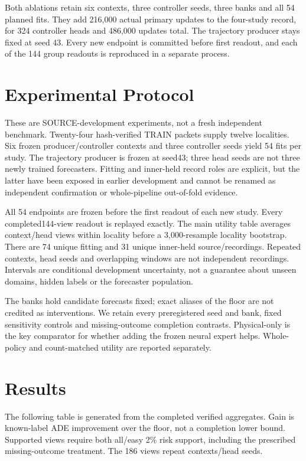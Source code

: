 \documentclass[10pt,twocolumn,letterpaper]{article}
\begin{document}
Both ablations retain six contexts, three controller seeds, three banks and all
54 planned fits. They add 216,000 actual primary updates to the four-study record,
for 324 controller heads and 486,000 updates total. The trajectory producer stays
fixed at seed 43. Every new endpoint is committed before first readout, and each
of the 144 group readouts is reproduced in a separate process.

\section{Experimental Protocol}
These are SOURCE-development experiments, not a fresh independent benchmark.
Twenty-four hash-verified TRAIN packets supply twelve localities. Six frozen
producer/controller contexts and three controller seeds yield 54 fits per study.
The trajectory producer is frozen at seed43; three head seeds are not three
newly trained forecasters. Fitting and inner-held record roles are explicit,
but the latter have been exposed in earlier development and cannot be renamed
as independent confirmation or whole-pipeline out-of-fold evidence.

All 54 endpoints are frozen before the first readout of each new study. Every
completed144-view readout is replayed exactly. The main utility table averages
context/head views within locality before a 3,000-resample locality bootstrap.
There are 74 unique fitting and 31 unique inner-held source/recordings. Repeated
contexts, head seeds and overlapping windows are not independent recordings.
Intervals are conditional development uncertainty, not a guarantee about unseen
domains, hidden labels or the forecaster population.

The banks hold candidate forecasts fixed; exact aliases of the floor are not
credited as interventions. We retain every preregistered seed and bank, fixed
sensitivity controls and missing-outcome completion contrasts. Physical-only
is the key comparator for whether adding the frozen neural expert helps.
Whole-policy and count-matched utility are reported separately.

\section{Results}
The following table is generated from the completed verified aggregates.
Gain is known-label ADE improvement over the floor, not a completion lower
bound. Supported views require both all/easy 2\% risk support, including the
prescribed missing-outcome treatment. The 186 views repeat contexts/head seeds.
\end{document}
